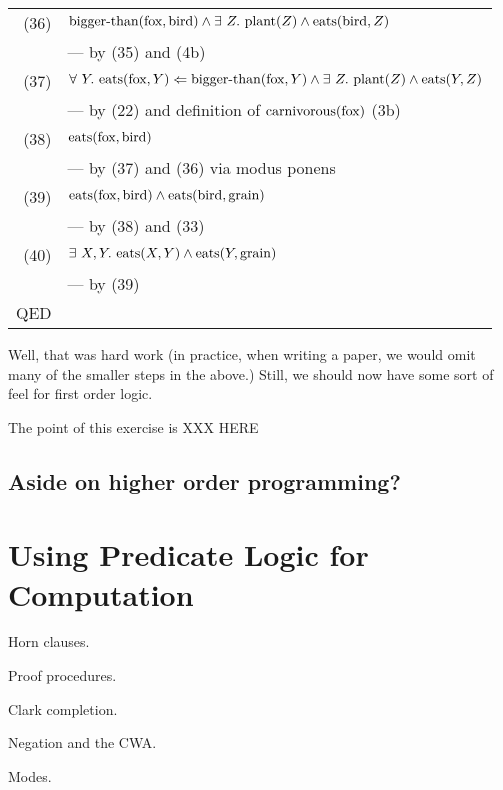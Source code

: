 \begin{tabular}{rl}
(36) & $\text{bigger-than}(\text{fox}, \text{bird}) \wedge
        \exists\ Z.\ \text{plant}(Z) \wedge \text{eats}(\text{bird}, Z)$
\\ & --- by (35) and (4b) \\
(37) & $\forall\ Y.\ \text{eats}(\text{fox}, Y) \Leftarrow
            \text{bigger-than}(\text{fox}, Y) \wedge
            \exists\ Z.\ \text{plant}(Z) \wedge \text{eats}(Y, Z)$
\\ & --- by (22) and definition of $\text{carnivorous}(\text{fox})$ (3b) \\
(38) & $\text{eats}(\text{fox}, \text{bird})$
\\ & --- by (37) and (36) via modus ponens \\
(39) & $\text{eats}(\text{fox}, \text{bird}) \wedge \text{eats}(\text{bird}, \text{grain})$
\\ & --- by (38) and (33) \\
(40) & $\exists\ X, Y.\ \text{eats}(X, Y) \wedge \text{eats}(Y, \text{grain})$
\\ & --- by (39) \\
QED \\
\end{tabular}

Well, that was hard work (in practice, when writing a paper, we would
omit many of the smaller steps in the above.)  Still, we should now have
some sort of feel for first order logic.

The point of this exercise is XXX HERE

\subsection{Aside on higher order programming?}


\section{Using Predicate Logic for Computation}

Horn clauses.

Proof procedures.

Clark completion.

Negation and the CWA.

Modes.



